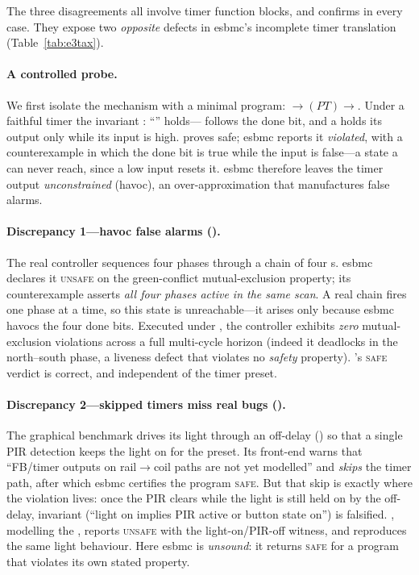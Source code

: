 The three disagreements all involve timer function blocks, and \openplc{} confirms
\kld{} in every case. They expose two \emph{opposite} defects in \gls{esbmc}'s
incomplete timer translation (Table~\ref{tab:e3tax}).

\paragraph{A controlled probe.} We first isolate the mechanism with a minimal program:
$\rightarrow$$(PT)$$\rightarrow$. Under a faithful timer
the invariant : ``'' holds--- follows the done
bit, and a  holds its output only while its input is high. \kld{} proves
 safe; \gls{esbmc} reports it \emph{violated}, with a counterexample in which
the done bit is true while the input is false---a state a  can never reach,
since a low input resets it. \gls{esbmc} therefore leaves the timer output
\emph{unconstrained} (havoc), an over-approximation that manufactures false alarms.

\paragraph{Discrepancy 1---havoc false alarms ().} The real
 controller sequences four phases through a chain of four
s. \gls{esbmc} declares it \textsc{unsafe} on the green-conflict
mutual-exclusion property; its counterexample asserts \emph{all four phases active in
the same scan}. A real  chain fires one phase at a time, so this state is
unreachable---it arises only because \gls{esbmc} havocs the four done bits. Executed
under \kld{}, the controller exhibits \emph{zero} mutual-exclusion violations across a
full multi-cycle horizon (indeed it deadlocks in the north--south phase, a liveness
defect that violates no \emph{safety} property). \kld{}'s \textsc{safe} verdict is
correct, and independent of the timer preset.

\paragraph{Discrepancy 2---skipped timers miss real bugs ().} The
graphical  benchmark drives its light through an off-delay
() so that a single PIR detection keeps the light on for the preset. Its
front-end warns that ``FB/timer outputs on rail$\rightarrow$coil paths are not yet
modelled'' and \emph{skips} the timer path, after which \gls{esbmc} certifies the
program \textsc{safe}. But that skip is exactly where the violation lives: once the PIR
clears while the light is still held on by the off-delay, invariant 
(``light on implies PIR active or button state on'') is falsified. \kld{}, modelling
the , reports  \textsc{unsafe} with the light-on/PIR-off witness, and
\openplc{} reproduces the same light behaviour. Here \gls{esbmc} is \emph{unsound}: it
returns \textsc{safe} for a program that violates its own stated property.

